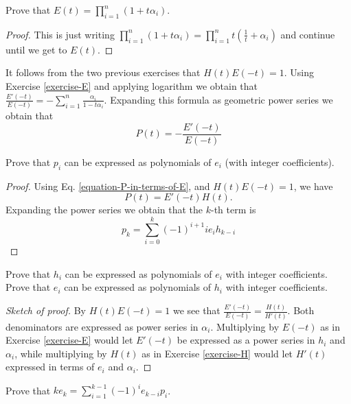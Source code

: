 \begin{exercise}
\label{exercise-E}
Prove that $E(t)=\prod_{i=1}^n(1+t\alpha_i)$.
\end{exercise}

\begin{proof}
This is just writing $\prod_{i=1}^n(1+t\alpha_i)
=\prod_{i=1}^nt(\frac{1}{t}+\alpha_i)$ and continue until we get to $E(t)$.
\end{proof}

\noindent
It follows from the two previous exercises that $H(t)E(-t)=1$. Using Exercise
\ref{exercise-E} and applying logarithm we obtain that
$\frac{E'(-t)}{E(-t)}=-\sum_{i=1}^n \frac{\alpha_i}{1-t\alpha_i}$. Expanding
this formula as geometric power series we obtain that 
\begin{equation}
\label{equation-P-in-terms-of-E}
P(t)=-\frac{E'(-t)}{E(-t)}
\end{equation}

\begin{exercise}
\label{exercise-p-polynomials-of-e}
Prove that $p_i$ can be expressed as polynomials of $e_i$ (with integer
coefficients).
\end{exercise}

\begin{proof}
Using Eq. \ref{equation-P-in-terms-of-E}, and $H(t)E(-t)=1$, we have
$$
P(t)=E'(-t)H(t).
$$
Expanding the power series we obtain that the $k$-th term is
$$
p_k=\sum_{i=0}^k(-1)^{i+1}ie_ih_{k-i}
$$
\end{proof}

\begin{exercise}
\label{exercise-h-and-e}
Prove that $h_i$ can be expressed as polynomials of $e_i$ with integer
coefficients. Prove that $e_i$ can be expressed as polynomials of $h_i$ with
integer coefficients.
\end{exercise}

\begin{proof}[Sketch of proof]
By $H(t)E(-t)=1$ we see that $\frac{E'(-t)}{E(-t)}=\frac{H(t)}{H'(t)}$. Both
denominators are expressed as power series in $\alpha_i$. Multiplying by $E(-t)$
as in Exercise \ref{exercise-E} 
would let $E'(-t)$ be expressed as a power series in $h_i$ and
$\alpha_i$, while multiplying by $H(t)$ as in Exercise \ref{exercise-H} would 
let $H'(t)$ expressed in terms of
$e_i$ and $\alpha_i$.
\end{proof}

\begin{exercise}
\label{exercise-newton-formula}
Prove that $ke_k=\sum_{i=1}^{k-1}(-1)^ie_{k-i}p_i$.
\end{exercise}

